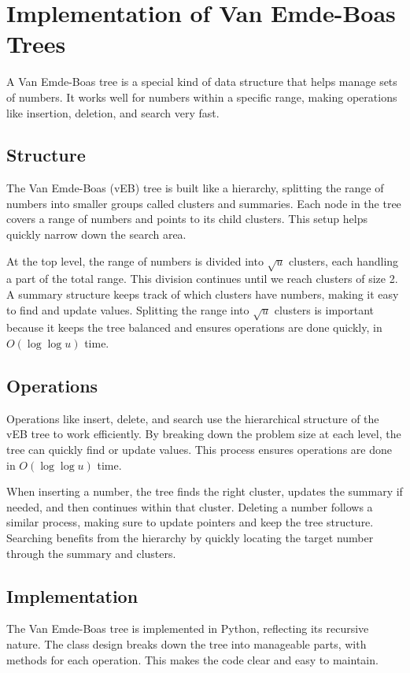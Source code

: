 \section{Implementation of Van Emde-Boas Trees}

A Van Emde-Boas tree is a special kind of data structure that helps manage sets of numbers. It works well for numbers within a specific range, making operations like insertion, deletion, and search very fast.

\subsection{Structure}
The Van Emde-Boas (vEB) tree is built like a hierarchy, splitting the range of numbers into smaller groups called clusters and summaries. Each node in the tree covers a range of numbers and points to its child clusters. This setup helps quickly narrow down the search area.

At the top level, the range of numbers is divided into \(\sqrt{u}\) clusters, each handling a part of the total range. This division continues until we reach clusters of size 2. A summary structure keeps track of which clusters have numbers, making it easy to find and update values. Splitting the range into \(\sqrt{u}\) clusters is important because it keeps the tree balanced and ensures operations are done quickly, in \(O(\log \log u)\) time.



\subsection{Operations}
Operations like insert, delete, and search use the hierarchical structure of the vEB tree to work efficiently. By breaking down the problem size at each level, the tree can quickly find or update values. This process ensures operations are done in \(O(\log \log u)\) time.

When inserting a number, the tree finds the right cluster, updates the summary if needed, and then continues within that cluster. Deleting a number follows a similar process, making sure to update pointers and keep the tree structure. Searching benefits from the hierarchy by quickly locating the target number through the summary and clusters.

\subsection{Implementation}
The Van Emde-Boas tree is implemented in Python, reflecting its recursive nature. The class design breaks down the tree into manageable parts, with methods for each operation. This makes the code clear and easy to maintain.

